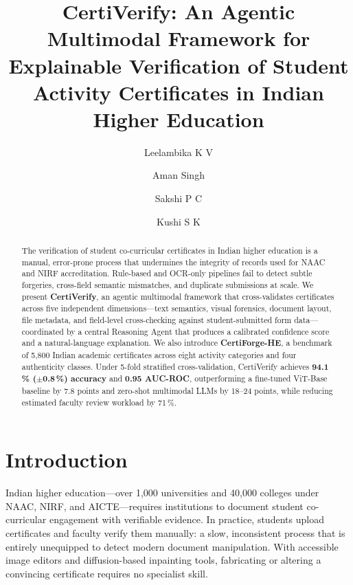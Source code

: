 \documentclass[runningheads]{llncs}
\begin{document}
\title{CertiVerify: An Agentic Multimodal Framework for Explainable Verification of Student Activity Certificates in Indian Higher Education}


\author{Leelambika K V \and Aman Singh\orcidID{} \and Sakshi P C \and Kushi S K}


\maketitle

\begin{abstract}
The verification of student co-curricular certificates in Indian higher education is a manual, error-prone process that undermines the integrity of records used for NAAC and NIRF accreditation. Rule-based and OCR-only pipelines fail to detect subtle forgeries, cross-field semantic mismatches, and duplicate submissions at scale. We present \textbf{CertiVerify}, an agentic multimodal framework that cross-validates certificates across five independent dimensions---text semantics, visual forensics, document layout, file metadata, and field-level cross-checking against student-submitted form data---coordinated by a central Reasoning Agent that produces a calibrated confidence score and a natural-language explanation. We also introduce \textbf{CertiForge-HE}, a benchmark of 5{,}800 Indian academic certificates across eight activity categories and four authenticity classes. Under 5-fold stratified cross-validation, CertiVerify achieves \textbf{94.1\,\% ($\pm$0.8\,\%) accuracy} and \textbf{0.95 AUC-ROC}, outperforming a fine-tuned ViT-Base baseline by 7.8 points and zero-shot multimodal LLMs by 18--24 points, while reducing estimated faculty review workload by 71\,\%.

\end{abstract}

\section{Introduction}
\label{sec:intro}

Indian higher education---over 1{,}000 universities and 40{,}000 colleges under NAAC, NIRF, and AICTE---requires institutions to document student co-curricular engagement with verifiable evidence. In practice, students upload certificates and faculty verify them manually: a slow, inconsistent process that is entirely unequipped to detect modern document manipulation. With accessible image editors and diffusion-based inpainting tools, fabricating or altering a convincing certificate requires no specialist skill.
\end{document}

